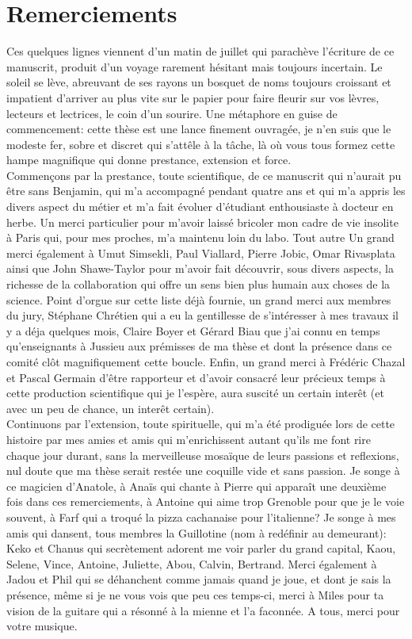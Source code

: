 \section*{Remerciements}

Ces quelques lignes viennent d'un matin de juillet qui parachève l'écriture de ce manuscrit, produit d'un voyage rarement hésitant mais toujours incertain. Le soleil se lève, abreuvant de ses rayons un bosquet de noms toujours croissant et impatient d'arriver au plus vite sur le papier pour faire fleurir sur vos lèvres, lecteurs et lectrices, le coin d'un sourire. 
Une métaphore en guise de commencement: cette thèse est une lance finement ouvragée, je n'en suis que le modeste fer, sobre et discret qui s'attêle à la tâche, là où vous tous formez cette hampe magnifique qui donne prestance, extension et force.\\
Commençons par la prestance, toute scientifique, de ce manuscrit qui n'aurait pu être sans Benjamin, qui m'a accompagné pendant quatre ans et qui m'a appris les divers aspect du métier et m'a fait évoluer d'étudiant enthousiaste à docteur en herbe. Un merci particulier pour m'avoir laissé bricoler mon cadre de vie insolite à Paris qui, pour mes proches, m'a maintenu loin du labo. Tout autre  Un grand merci également à Umut Simsekli, Paul Viallard, Pierre Jobic, Omar Rivasplata ainsi que John Shawe-Taylor pour m'avoir fait découvrir, sous divers aspects, la richesse de la collaboration qui offre un sens bien plus humain aux choses de la science. Point d'orgue sur cette liste déjà fournie, un grand merci aux membres du jury, Stéphane Chrétien qui a eu la gentillesse de s'intéresser à mes travaux il y a déja quelques mois, Claire Boyer et Gérard Biau que j'ai connu en temps qu'enseignants à Jussieu aux prémisses de ma thèse et dont la présence dans ce comité clôt magnifiquement cette boucle. Enfin, un grand merci à Frédéric Chazal et Pascal Germain d'être rapporteur et d'avoir consacré leur précieux temps à cette production scientifique qui je l'espère, aura suscité un certain interêt (et avec un peu de chance, un interêt certain).\\
Continuons par l'extension, toute spirituelle, qui m'a été prodiguée lors de cette histoire par mes amies et amis qui m'enrichissent autant qu'ils me font rire chaque jour durant, sans la merveilleuse mosaïque de leurs passions et reflexions, nul doute que ma thèse serait restée une coquille vide et sans passion. Je songe à ce magicien d'Anatole, à Anaïs qui chante à Pierre qui apparaît une deuxième fois dans ces remerciements, à Antoine qui aime trop Grenoble pour que je le voie souvent, à Farf qui a troqué la pizza cachanaise pour l'italienne? Je songe à mes amis qui dansent, tous membres la Guillotine (nom à redéfinir au demeurant): Keko et Chanus qui secrètement adorent me voir parler du grand capital, Kaou, Selene, Vince, Antoine, Juliette, Abou, Calvin, Bertrand. Merci également à Jadou et Phil qui se déhanchent comme jamais quand je joue, et dont je sais la présence, même si je ne vous vois que peu ces temps-ci, merci à Miles pour ta vision de la guitare qui a résonné à la mienne et l'a faconnée. A tous, merci pour votre musique. 
